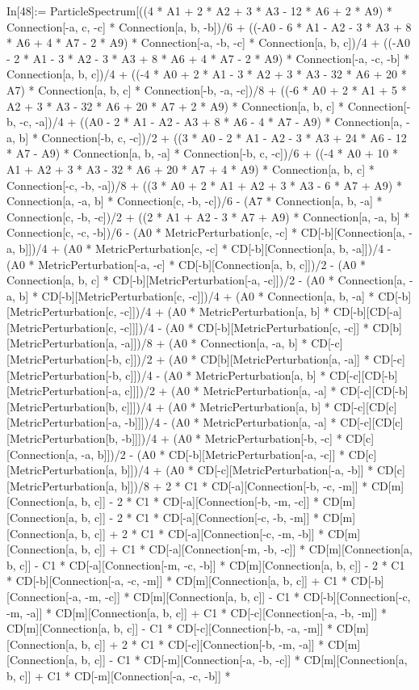 In[48]:= ParticleSpectrum[((4 * A1 + 2 * A2 + 3 * A3 - 12 * A6 + 2 * A9) * Connection[-a, c, -c] * Connection[a, b, -b])/6 + ((-A0 - 6 * A1 - A2 - 3 * A3 + 8 * A6 + 4 * A7 - 2 * A9) * Connection[-a, -b, -c] * Connection[a, b, c])/4 + ((-A0 - 2 * A1 - 3 * A2 - 3 * A3 + 8 * A6 + 4 * A7 - 2 * A9) * Connection[-a, -c, -b] * Connection[a, b, c])/4 + ((-4 * A0 + 2 * A1 - 3 * A2 + 3 * A3 - 32 * A6 + 20 * A7) * Connection[a, b, c] * Connection[-b, -a, -c])/8 + ((-6 * A0 + 2 * A1 + 5 * A2 + 3 * A3 - 32 * A6 + 20 * A7 + 2 * A9) * Connection[a, b, c] * Connection[-b, -c, -a])/4 + ((A0 - 2 * A1 - A2 - A3 + 8 * A6 - 4 * A7 - A9) * Connection[a, -a, b] * Connection[-b, c, -c])/2 + ((3 * A0 - 2 * A1 - A2 - 3 * A3 + 24 * A6 - 12 * A7 - A9) * Connection[a, b, -a] * Connection[-b, c, -c])/6 + ((-4 * A0 + 10 * A1 + A2 + 3 * A3 - 32 * A6 + 20 * A7 + 4 * A9) * Connection[a, b, c] * Connection[-c, -b, -a])/8 + ((3 * A0 + 2 * A1 + A2 + 3 * A3 - 6 * A7 + A9) * Connection[a, -a, b] * Connection[c, -b, -c])/6 - (A7 * Connection[a, b, -a] * Connection[c, -b, -c])/2 + ((2 * A1 + A2 - 3 * A7 + A9) * Connection[a, -a, b] * Connection[c, -c, -b])/6 - (A0 * MetricPerturbation[c, -c] * CD[-b][Connection[a, -a, b]])/4 + (A0 * MetricPerturbation[c, -c] * CD[-b][Connection[a, b, -a]])/4 - (A0 * MetricPerturbation[-a, -c] * CD[-b][Connection[a, b, c]])/2 - (A0 * Connection[a, b, c] * CD[-b][MetricPerturbation[-a, -c]])/2 - (A0 * Connection[a, -a, b] * CD[-b][MetricPerturbation[c, -c]])/4 + (A0 * Connection[a, b, -a] * CD[-b][MetricPerturbation[c, -c]])/4 + (A0 * MetricPerturbation[a, b] * CD[-b][CD[-a][MetricPerturbation[c, -c]]])/4 - (A0 * CD[-b][MetricPerturbation[c, -c]] * CD[b][MetricPerturbation[a, -a]])/8 + (A0 * Connection[a, -a, b] * CD[-c][MetricPerturbation[-b, c]])/2 + (A0 * CD[b][MetricPerturbation[a, -a]] * CD[-c][MetricPerturbation[-b, c]])/4 - (A0 * MetricPerturbation[a, b] * CD[-c][CD[-b][MetricPerturbation[-a, c]]])/2 + (A0 * MetricPerturbation[a, -a] * CD[-c][CD[-b][MetricPerturbation[b, c]]])/4 + (A0 * MetricPerturbation[a, b] * CD[-c][CD[c][MetricPerturbation[-a, -b]]])/4 - (A0 * MetricPerturbation[a, -a] * CD[-c][CD[c][MetricPerturbation[b, -b]]])/4 + (A0 * MetricPerturbation[-b, -c] * CD[c][Connection[a, -a, b]])/2 - (A0 * CD[-b][MetricPerturbation[-a, -c]] * CD[c][MetricPerturbation[a, b]])/4 + (A0 * CD[-c][MetricPerturbation[-a, -b]] * CD[c][MetricPerturbation[a, b]])/8 + 2 * C1 * CD[-a][Connection[-b, -c, -m]] * CD[m][Connection[a, b, c]] - 2 * C1 * CD[-a][Connection[-b, -m, -c]] * CD[m][Connection[a, b, c]] - 2 * C1 * CD[-a][Connection[-c, -b, -m]] * CD[m][Connection[a, b, c]] + 2 * C1 * CD[-a][Connection[-c, -m, -b]] * CD[m][Connection[a, b, c]] + C1 * CD[-a][Connection[-m, -b, -c]] * CD[m][Connection[a, b, c]] - C1 * CD[-a][Connection[-m, -c, -b]] * CD[m][Connection[a, b, c]] - 2 * C1 * CD[-b][Connection[-a, -c, -m]] * CD[m][Connection[a, b, c]] + C1 * CD[-b][Connection[-a, -m, -c]] * CD[m][Connection[a, b, c]] - C1 * CD[-b][Connection[-c, -m, -a]] * CD[m][Connection[a, b, c]] + C1 * CD[-c][Connection[-a, -b, -m]] * CD[m][Connection[a, b, c]] - C1 * CD[-c][Connection[-b, -a, -m]] * CD[m][Connection[a, b, c]] + 2 * C1 * CD[-c][Connection[-b, -m, -a]] * CD[m][Connection[a, b, c]] - C1 * CD[-m][Connection[-a, -b, -c]] * CD[m][Connection[a, b, c]] + C1 * CD[-m][Connection[-a, -c, -b]] * 